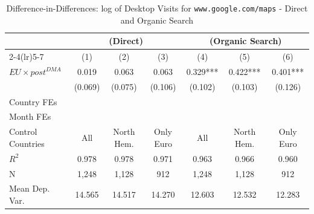 \documentclass[11pt]{article}
\begin{document}
	
	\begin{table}
		\centering
		\def\sym#1{\ifmmode^{#1}\else\(^{#1}\)\fi}
		\caption{\label{tab:did_direct_organic} Difference-in-Differences: log of Desktop Visits for \texttt{www.google.com/maps} - Direct and Organic Search}
		\begin{threeparttable}
			\begin{tabular}{lcccccc}
				\hline \noalign{\smallskip} 
				& \multicolumn{3}{c}{(Direct)} & \multicolumn{3}{c}{(Organic Search)}  \\ \cmidrule(lr){2-4}\cmidrule(lr){5-7}
				
				&         (1)   &         (2)   &         (3)   &         (4)   &         (5)   &         (6)   \\
				\midrule
				$ EU \times post^{DMA} $ &       0.019   &       0.063   &       0.063   &       0.329***&       0.422***&       0.401***\\
				&     (0.069)   &     (0.075)   &     (0.106)   &     (0.102)   &     (0.103)   &     (0.126)   \\
				
				Country FEs         &  \checkmark   &  \checkmark   &  \checkmark   &  \checkmark   &  \checkmark   &  \checkmark   \\
				Month FEs           &  \checkmark   &  \checkmark   &  \checkmark   &  \checkmark   &  \checkmark   &  \checkmark   \\
				Control Countries   &         All   &  North Hem.   &   Only Euro   &         All   &  North Hem.   &   Only Euro   \\
				$ R ^2 $            &       0.978   &       0.978   &       0.971   &       0.963   &       0.966   &       0.960   \\
				N                   &       1,248   &       1,128   &         912   &       1,248   &       1,128   &         912   \\
				Mean Dep. Var.      &      14.565   &      14.517   &      14.270   &      12.603   &      12.532   &      12.283   \\
				\midrule
			\end{tabular}
			

\end{threeparttable}
\end{table}
\end{document}
